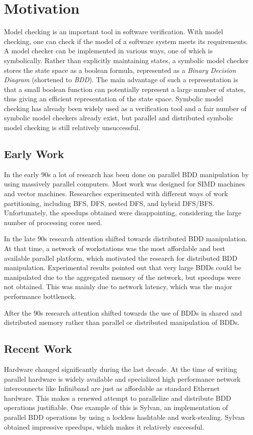 \chapter{Motivation}

Model checking is an important tool in software verification. With model checking, one can check if the model of a software system meets its requirements. A model checker can be implemented in various ways, one of which is symbolically. Rather than explicitly maintaining states, a symbolic model checker stores the state space as a boolean formula, represented as a \emph{Binary Decision Diagram} (shortened to \emph{BDD}). The main advantage of such a representation is that a small boolean function can potentially represent a large number of states, thus giving an efficient representation of the state space. Symbolic model checking has already been widely used as a verification tool and a fair number of symbolic model checkers already exist, but parallel and distributed symbolic model checking is still relatively unsuccessful.

\section{Early Work}
In the early 90s a lot of research has been done on parallel BDD manipulation by using massively parallel computers. Most work was designed for SIMD machines and vector machines. Researches experimented with different ways of work partitioning, including BFS, DFS, nested DFS, and hybrid DFS/BFS. Unfortunately, the speedups obtained were disappointing, considering the large number of processing cores used.

In the late 90s research attention shifted towards distributed BDD manipulation. At that time, a network of workstations was the most affordable and best available parallel platform, which motivated the research for distributed BDD manipulation. Experimental results pointed out that very large BDDs could be manipulated due to the aggregated memory of the network, but speedups were not obtained. This was mainly due to network latency, which was the major performance bottleneck. 

After the 90s research attention shifted towards the use of BDDs in shared and distributed memory rather than parallel or distributed manipulation of BDDs.

\section{Recent Work}
Hardware changed significantly during the last decade. At the time of writing parallel hardware is widely available and specialized high performance network interconnects like Infiniband are just as affordable as standard Ethernet hardware. This makes a renewed attempt to parallelize and distribute BDD operations justifiable. One example of this is Sylvan, an implementation of parallel BDD operations by using a lockless hashtable and work-stealing. Sylvan obtained impressive speedups, which makes it relatively successful.


